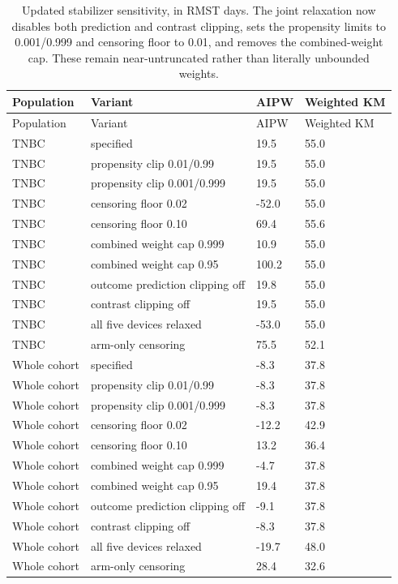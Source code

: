 \documentclass[12pt,letterpaper]{article}
\begin{document}
\begin{longtable}{p{1.0in}p{3.0in}p{0.8in}p{1.0in}}
\caption{Updated stabilizer sensitivity, in RMST days. The joint relaxation now disables both prediction and contrast clipping, sets the propensity limits to 0.001/0.999 and censoring floor to 0.01, and removes the combined-weight cap. These remain near-untruncated rather than literally unbounded weights.}\\
\toprule
Population & Variant & AIPW & Weighted KM \\
\midrule\endfirsthead
\toprule
Population & Variant & AIPW & Weighted KM \\
\midrule\endhead
\bottomrule\endfoot
TNBC & specified & 19.5 & 55.0 \\
TNBC & propensity clip 0.01/0.99 & 19.5 & 55.0 \\
TNBC & propensity clip 0.001/0.999 & 19.5 & 55.0 \\
TNBC & censoring floor 0.02 & -52.0 & 55.0 \\
TNBC & censoring floor 0.10 & 69.4 & 55.6 \\
TNBC & combined weight cap 0.999 & 10.9 & 55.0 \\
TNBC & combined weight cap 0.95 & 100.2 & 55.0 \\
TNBC & outcome prediction clipping off & 19.8 & 55.0 \\
TNBC & contrast clipping off & 19.5 & 55.0 \\
TNBC & all five devices relaxed & -53.0 & 55.0 \\
TNBC & arm-only censoring & 75.5 & 52.1 \\
Whole cohort & specified & -8.3 & 37.8 \\
Whole cohort & propensity clip 0.01/0.99 & -8.3 & 37.8 \\
Whole cohort & propensity clip 0.001/0.999 & -8.3 & 37.8 \\
Whole cohort & censoring floor 0.02 & -12.2 & 42.9 \\
Whole cohort & censoring floor 0.10 & 13.2 & 36.4 \\
Whole cohort & combined weight cap 0.999 & -4.7 & 37.8 \\
Whole cohort & combined weight cap 0.95 & 19.4 & 37.8 \\
Whole cohort & outcome prediction clipping off & -9.1 & 37.8 \\
Whole cohort & contrast clipping off & -8.3 & 37.8 \\
Whole cohort & all five devices relaxed & -19.7 & 48.0 \\
Whole cohort & arm-only censoring & 28.4 & 32.6 \\
\end{longtable}
\end{document}

